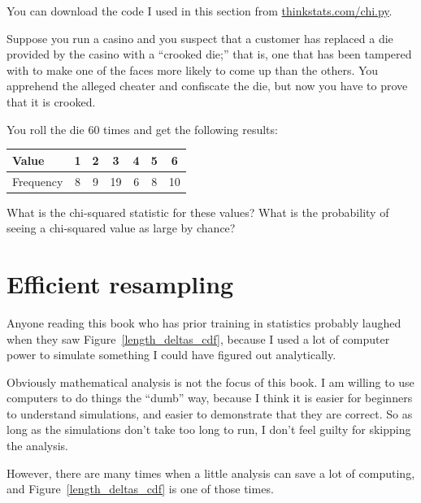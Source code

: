 \documentclass[12pt]{book}
\begin{document}
You can download the code I used in this section from
\url{thinkstats.com/chi.py}.



\begin{ex}

Suppose you run a casino and you suspect that a customer has
replaced a die provided by the casino with a ``crooked die;'' that
is, one that has been tampered with to make one of the faces more
likely to come up than the others.  You apprehend the alleged
cheater and confiscate the die, but now you have to prove that it
is crooked.

You roll the die 60 times and get the following results:

\begin{center}
\begin{tabular}{|l|c|c|c|c|c|c|}
\hline
Value     &  1  &  2  &  3  &  4  &  5  &  6  \\ 
\hline
\hline
Frequency &  8  &  9  &  19  &  6  &  8  &  10  \\
\hline
\end{tabular}
\end{center}

What is the chi-squared statistic for these values?  What is the
probability of seeing a chi-squared value as large by chance?

\end{ex}




\section{Efficient resampling}

Anyone reading this book who has prior training in statistics probably
laughed when they saw Figure~\ref{length_deltas_cdf}, because I used a
lot of computer power to simulate something I could have figured out
analytically.

Obviously mathematical analysis is not the focus of this book.  I am
willing to use computers to do things the ``dumb'' way, because I
think it is easier for beginners to understand simulations, and easier
to demonstrate that they are correct.  So as long as the simulations
don't take too long to run, I don't feel guilty for skipping the
analysis.

However, there are many times when a little analysis can save a lot of
computing, and Figure~\ref{length_deltas_cdf} is one of those times.
\end{document}
